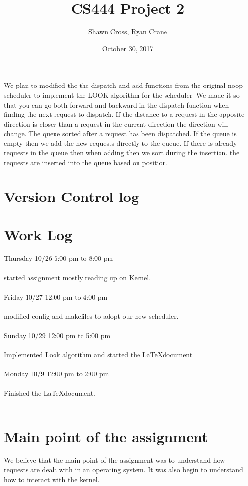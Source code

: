 \documentclass[letterpaper,10pt,titlepage]{article}
\begin{document}
\title{CS444 Project 2}
\date{October 30, 2017}
\author{Shawn Cross, Ryan Crane}
\maketitle

We plan to modified the the dispatch and add functions from the original noop 
scheduler to implement the LOOK algorithm for the scheduler. We made it so that 
you can go both forward and backward in the dispatch function when finding the 
next request to dispatch. If the distance to a request in the opposite 
direction is closer than a request in the current direction the direction will 
change. The queue sorted after a request has been dispatched. If the queue is 
empty then we add the new requests directly to the queue. If there is already 
requests in the queue then when adding then we sort during the insertion. the 
requests are inserted into the queue based on position. 

\section{Version Control log}


\section{Work Log}
Thursday 10/26 6:00 pm to 8:00 pm\\\\
started assignment mostly reading up on Kernel.\\\\ 
Friday 10/27 12:00 pm to 4:00 pm \\\\
modified config and makefiles to adopt our new scheduler.\\\\
Sunday 10/29 12:00 pm to 5:00 pm \\\\
Implemented Look algorithm and started the \LaTeX document.\\\\
Monday 10/9 12:00 pm to 2:00 pm \\\\
Finished the \LaTeX document.\\\\

\section{Main point of the assignment}
We believe that the main point of the assignment was to understand how requests 
are dealt with in an operating system. It was also begin to understand how to 
interact with the kernel. 
\end{document}
